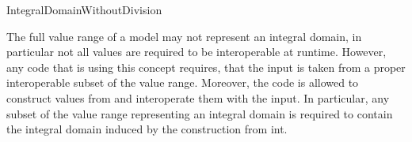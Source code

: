 \begin{ccRefConcept}{IntegralDomainWithoutDivision}
{\begin{ccAdvanced}

The full value range of a model may not represent an integral domain, in particular not all values are required to be interoperable at runtime. However, any code that is using this concept requires, that the input is taken from a proper interoperable subset of the value range. Moreover, the code is allowed to construct values from  and interoperate them with the input. In particular, any subset of the value range representing an integral domain is required to contain the integral domain induced by the construction from int.

\end{ccAdvanced}

}

\end{ccRefConcept}




